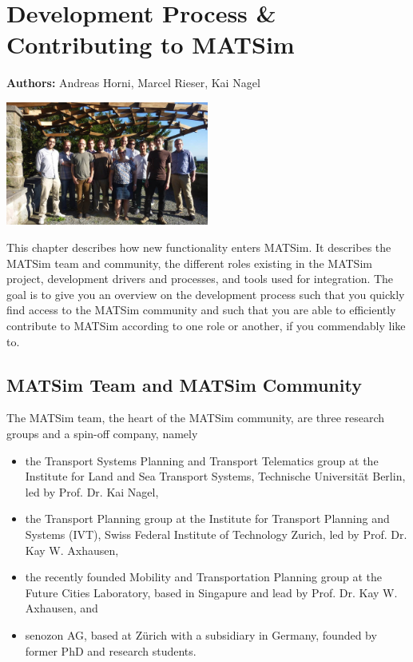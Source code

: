 \chapter{Development Process \& Contributing to MATSim}
\label{ch:developmentprocess}

\hfill \textbf{Authors:} Andreas Horni, Marcel Rieser, Kai Nagel

\begin{center} \includegraphics[width=0.5\textwidth, angle=0]{extending/figures/ConceptualMeetingVillaHatt.png} \end{center}

This chapter describes how new functionality enters MATSim. It describes the MATSim team and community, the different roles existing in the MATSim project, development drivers and processes, and tools used for integration. The goal is to give you an overview on the development process such that you quickly find access to the MATSim community and such that you are able to efficiently contribute to MATSim according to one role or another, if you commendably like to.

\section{MATSim Team and MATSim Community}
The MATSim team, the heart of the MATSim community, are three research groups and a spin-off company, namely 
\begin{itemize}
\item the Transport Systems Planning and Transport Telematics group at the Institute for Land and Sea Transport Systems, Technische Universität Berlin, led by Prof. Dr. Kai Nagel,
\item the Transport Planning group at the Institute for Transport Planning and Systems (IVT), Swiss Federal Institute of Technology Zurich, led by Prof. Dr. Kay W. Axhausen, 
\item the recently founded Mobility and Transportation Planning group at the Future Cities Laboratory, based in Singapure and lead by Prof. Dr. Kay W. Axhausen, and 
\item senozon AG, based at Zürich with a subsidiary in Germany, founded by former PhD and research students. 
\end{itemize}

